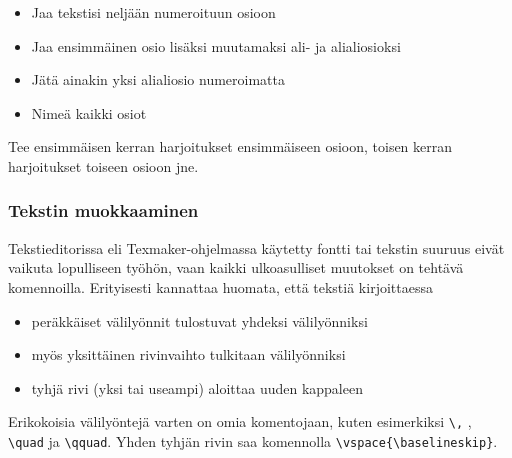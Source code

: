 \begin{fframe}
    \begin{harj}
        \begin{itemize}
            \item Jaa tekstisi neljään numeroituun osioon
            \item Jaa ensimmäinen osio lisäksi muutamaksi ali- ja alialiosioksi
            \item Jätä ainakin yksi alialiosio numeroimatta
            \item Nimeä kaikki osiot
        \end{itemize}
        Tee ensimmäisen kerran harjoitukset ensimmäiseen osioon, toisen kerran harjoitukset toiseen osioon jne. 
    \end{harj}
\end{fframe}

\begin{fframe}
    \frametitle{Tekstin muokkaaminen}
    Tekstieditorissa eli Texmaker-ohjelmassa käytetty fontti tai tekstin suuruus eivät vaikuta lopulliseen työhön, vaan kaikki ulkoasulliset muutokset on tehtävä komennoilla.%
    \vaihto\pause
    Erityisesti kannattaa huomata, että tekstiä kirjoittaessa
    \begin{itemize}[<+->]
        \item peräkkäiset välilyönnit tulostuvat yhdeksi välilyönniksi
        \item myös yksittäinen rivinvaihto tulkitaan välilyönniksi
        \item tyhjä rivi (yksi tai useampi) aloittaa uuden kappaleen
    \end{itemize}
    \pause
    Erikokoisia välilyöntejä varten on omia komentojaan, kuten esimerkiksi \lstinline-\,- , \lstinline-\quad- ja \lstinline-\qquad-.
    \vaihto\pause 
	Yhden tyhjän rivin saa komennolla \lstinline-\vspace{\baselineskip}-.
\end{fframe}

%

